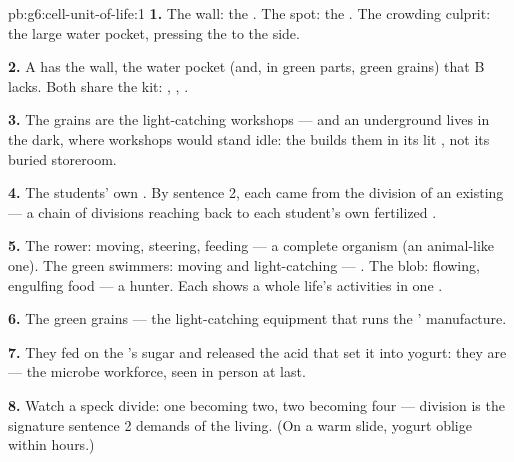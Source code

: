 \begin{solution}{pb:g6:cell-unit-of-life:1}
\textbf{1.} The wall: the  . The spot: the
. The crowding culprit: the large water pocket,
pressing the  to the side.

\textbf{2.} A has the wall, the water pocket (and, in green
parts, green grains) that B lacks. Both share the kit:
, , .

\textbf{3.} The grains are the light-catching workshops ---
and an underground  lives in the dark, where workshops
would stand idle: the  builds them in its lit ,
not its buried storeroom.

\textbf{4.} The students' own . By sentence 2, each
came from the division of an existing  --- a chain of
divisions reaching back to each student's own fertilized
.

\textbf{5.} The rower: moving, steering, feeding --- a
complete  organism (an animal-like one). The
green swimmers: moving and light-catching --- 
. The blob: flowing, engulfing food --- a
 hunter. Each shows a whole life's activities in
one .

\textbf{6.} The green grains --- the light-catching
equipment that runs the ' manufacture.

\textbf{7.} They fed on the 's sugar and released the
acid that set it into yogurt: they are   --- the microbe workforce, seen in person at last.

\textbf{8.} Watch a speck divide: one becoming two, two
becoming four --- division is the signature sentence 2
demands of the living. (On a warm slide, yogurt 
oblige within hours.)


\end{solution}
